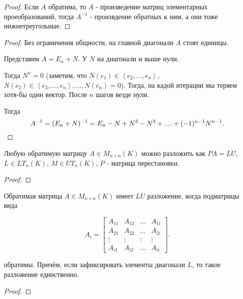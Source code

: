 \begin{statement}
\begin{enumerate}
\begin{proof}
               Если $A$ обратима, то $A$ - произведение матриц элементарных проеобразований, тогда $A^{-1}$ - произвдение обратных к ним, а они тоже нижнетреугольные.
            \end{proof}
            \begin{proof} \thmslashn
            
                Без ограничения общности, на главной диагонали $A$ стоят единицы.

                Представим $A = E_{n} + N$. У $N$ на диагонали и выше нули.

                Тогда $N^{n} = 0$ (заметим, что $N(e_1)\in \left<e_2, \ldots, e_{n}\right>$, $N(e_{2})\in \left<e_3, \ldots, e_{n}\right>, \ldots, N(e_{n}) = 0$). Тогда, на кадой итерации мы теряем хотя-бы один вектор. После $n$ шагов везде нули.

                Тогда
                \[ A^{-1} = (E_{n} + N)^{-1} = E_{n} - N + N^2 - N^3 + \ldots + (-1)^{n-1}N^{n-1} .\qedhere\] 
            \end{proof}
    \end{enumerate}
\end{statement}
\begin{theorem} \thmslashn

    Любую обратимую матрицу $A\in M_{n \times n}(K)$ можно разложить как $PA = LU$, $L\in LT_{n}(K)$, $M\in UT_{n}(K)$, $P$ - матрица перестановки.
    \begin{proof} \thmslashn
        
        \TODO
    \end{proof}
\end{theorem}
\begin{consequence} \thmslashn

    Обратимая матрица $A\in M_{n \times n}(K)$ имеет $LU$ разложение, когда подматрицы вида 
    
    \[ A_{i} =  \begin{bmatrix} A_{11} & A_{12} & \ldots & A_{1i}\\ A_{21} & A_{22} & \ldots & A_{2i}\\ \vdots & \vdots & \vdots & \vdots\\ A_{i1} & A_{i2} & \ldots & A_{ii} \end{bmatrix} .\]
    
    обратимы. Причём, если зафиксировать элементы диагонали $L$, то такое разложение единственно.
    \begin{proof} \thmslashn
    
        \TODO    
    \end{proof}
\end{consequence}
